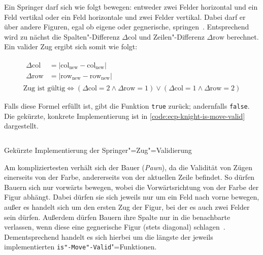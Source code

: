 
Ein Springer darf sich wie folgt bewegen: entweder zwei Felder horizontal und ein Feld vertikal oder ein Feld horizontale und zwei Felder vertikal. Dabei darf er über andere Figuren, egal ob eigene oder gegnerische, springen~\cite{justUSChessFederations2019}. Entsprechend wird zu nächst die Spalten"-Differenz $\Delta\text{col}$ und Zeilen"-Differenz $\Delta\text{row}$ berechnet. Ein valider Zug ergibt sich somit wie folgt:

\vspace{-1em}
\begin{gather*}
    \begin{aligned}
        \Delta\text{col} &= \vert \text{col}_{\text{new}} - \text{col}_{\text{new}} \vert \\
        \Delta\text{row} &= \vert \text{row}_{\text{new}} - \text{row}_{\text{new}} \vert
    \end{aligned}
    \\
    \text{Zug ist gültig} \iff (\Delta\text{col} = 2 \land \Delta\text{row} = 1) \lor (\Delta\text{col} = 1 \land \Delta\text{row} = 2)
\end{gather*}

Falls diese Formel erfüllt ist, gibt die Funktion \texttt{true} zurück; andernfalls \texttt{false}. Die gekürzte, konkrete Implementierung ist in \autoref{code:ecp-knight-is-move-valid} dargestellt.

\begin{listing}[h]
    \inputminted{cpp}{../assets/code/ECPKnight::isMoveValid.cpp}
    \caption{Gekürzte Implementierung der Springer"=Zug"=Validierung}
    \label{code:ecp-knight-is-move-valid}
\end{listing}


Am kompliziertesten verhält sich der Bauer (\emph{Pawn}), da die Validität von Zügen einerseits von der Farbe, andererseits von der aktuellen Zeile befindet. So dürfen Bauern sich nur vorwärts bewegen, wobei die Vorwärtsrichtung von der Farbe der Figur abhängt. Dabei dürfen sie sich jeweils nur um ein Feld nach vorne bewegen, außer es handelt sich um den ersten Zug der Figur, bei der es auch zwei Felder sein dürfen. Außerdem dürfen Bauern ihre Spalte nur in die benachbarte verlassen, wenn diese eine gegnerische Figur (stets diagonal) schlagen~\cite{justUSChessFederations2019}. Dementsprechend handelt es sich hierbei um die längste der jeweils implementierten \texttt{is"-Move"-Valid}"=Funktionen.

